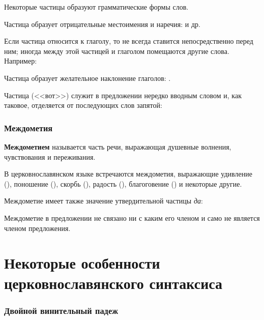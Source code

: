 \documentclass[11pt,a4paper,oneside]{memoir}
\begin{document}
    Некоторые частицы образуют грамматические формы слов.
    
    Частица {} образует отрицательные местоимения и наречия: {} и др.
    
    Если частица {} относится к глаголу, то не всегда ставится непосредственно перед ним; иногда между этой частицей и глаголом помещаются другие слова. Например:

    \bigskip{}

    Частица {} образует желательное наклонение глаголов: {}.
    
    Частица {} (<<вот>>) служит в предложении нередко вводным словом и, как таковое, отделяется от последующих слов запятой:

    \bigskip{}

                \subsubsection{Междометия}

    \textbf{Междометием} называется часть речи, выражающая душевные волнения, чувствования и переживания.
    
    В церковнославянском языке встречаются междометия, выражающие удивление ({}), поношение ({}), скорбь ({}), радость ({}), благоговение ({}) и некоторые другие.
    
    Междометие {} имеет также значение утвердительной частицы \emph{да}:

    \bigskip{}

    Междометие в предложении не связано ни с каким его членом и само не является членом предложения.

        \section{Некоторые особенности церковнославянского синтаксиса}
                \subsubsection{Двойной винительный падеж}
\end{document}
